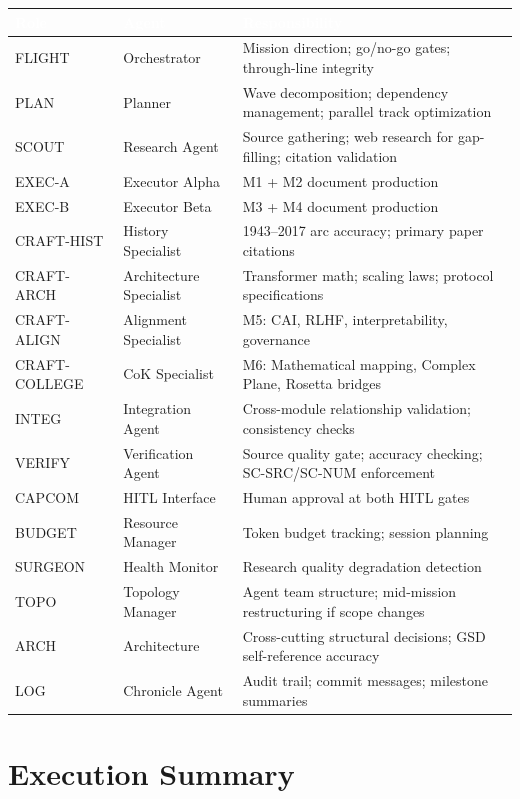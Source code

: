 \documentclass[11pt,letterpaper]{article}
\newcommand{\tableheader}[1]{\textbf{\sffamily\textcolor{white}{#1}}}
\begin{document}
\begin{center}
\begin{tabularx}{\textwidth}{C{2cm}L{3cm}X}
\toprule
{}
\tableheader{Role} & \tableheader{Agent} & \tableheader{Responsibility} \\
\midrule
FLIGHT & Orchestrator & Mission direction; go/no-go gates; through-line integrity \\
PLAN & Planner & Wave decomposition; dependency management; parallel track optimization \\
SCOUT & Research Agent & Source gathering; web research for gap-filling; citation validation \\
EXEC-A & Executor Alpha & M1 + M2 document production \\
EXEC-B & Executor Beta & M3 + M4 document production \\
CRAFT-HIST & History Specialist & 1943--2017 arc accuracy; primary paper citations \\
CRAFT-ARCH & Architecture Specialist & Transformer math; scaling laws; protocol specifications \\
CRAFT-ALIGN & Alignment Specialist & M5: CAI, RLHF, interpretability, governance \\
CRAFT-COLLEGE & CoK Specialist & M6: Mathematical mapping, Complex Plane, Rosetta bridges \\
INTEG & Integration Agent & Cross-module relationship validation; consistency checks \\
VERIFY & Verification Agent & Source quality gate; accuracy checking; SC-SRC/SC-NUM enforcement \\
CAPCOM & HITL Interface & Human approval at both HITL gates \\
BUDGET & Resource Manager & Token budget tracking; session planning \\
SURGEON & Health Monitor & Research quality degradation detection \\
TOPO & Topology Manager & Agent team structure; mid-mission restructuring if scope changes \\
ARCH & Architecture & Cross-cutting structural decisions; GSD self-reference accuracy \\
LOG & Chronicle Agent & Audit trail; commit messages; milestone summaries \\
\bottomrule
\end{tabularx}
\end{center}

\section{Execution Summary}
\end{document}
